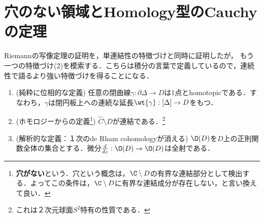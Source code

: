 \documentclass[uplatex, dvipdfmx]{jsreport}
\begin{document}
\section{穴のない領域とHomology型のCauchyの定理}

\begin{tcolorbox}[colframe=ForestGreen, colback=ForestGreen!10!white,breakable,colbacktitle=ForestGreen!40!white,coltitle=black,fonttitle=\bfseries\sffamily,
title=]
    Riemannの写像定理の証明を，単連結性の特徴づけと同時に証明したが，
    もう一つの特徴づけ(2)を模索する．こちらは積分の言葉で定義しているので，連続性で語るより強い特徴づけを得ることになる．
    \begin{enumerate}
        \item (純粋に位相的な定義) 任意の閉曲線$\gamma:\partial\Delta\to D$は1点とhomotopicである．すなわち，$\gamma$は閉円板上への連続な延長$\wt{\gamma}:[\Delta]\to D$をもつ．
        \item (ホモロジーからの定義\footnote{\textbf{穴がない}という．穴という概念は，$\C\setminus D$の有界な連結部分として検出する．よってこの条件は，$\C\setminus D$に有界な連結成分が存在しない，と言い換えて良い．}) $\hat{C}\setminus D$が連結である．\footnote{これは２次元球面$S^2$特有の性質である．}
        \item (解析的な定義：１次のde Rham cohomologyが消える) $\O(D)$を$D$上の正則関数全体の集合とする．微分$\frac{d}{dz}:\O(D)\to\O(D)$は全射である．
    \end{enumerate}
\end{tcolorbox}
\end{document}

